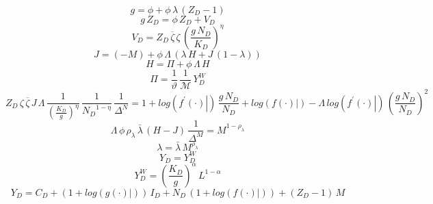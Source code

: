 \documentclass[10pt,a4paper]{article}
\begin{document}
\footnotesize
\begin{dmath}
{g}=\phi+\phi\, {\lambda}\, \left({Z_D}-1\right)
\end{dmath}
\begin{dmath}
{g}\, {Z_D}=\phi\, {Z_D}+{V_D}
\end{dmath}
\begin{dmath}
{V_D}={Z_D}\, {\overline{\zeta}}\, {\zeta}\, \left(\frac{{g}\, {N_D}}{{K_D}}\right)^{\eta}
\end{dmath}
\begin{dmath}
{J}=\left(-{M}\right)+\phi\, {\Lambda}\, \left({\lambda}\, {H}+{J}\, \left(1-{\lambda}\right)\right)
\end{dmath}
\begin{dmath}
{H}={\Pi}+\phi\, {\Lambda}\, {H}
\end{dmath}
\begin{dmath}
{\Pi}=\frac{1}{\vartheta}\, \frac{1}{{\mathcal{M}}}\, {Y^W_D}
\end{dmath}
\begin{dmath}
{Z_D}\, {\zeta}\, {\overline{\zeta}}\, {J}\, {\Lambda}\, \frac{1}{\left(\frac{{K_D}}{{g}}\right)^{\eta}}\, \frac{1}{{N_D}^{1-\eta}}\, \frac{1}{{\Delta^N}}=1+log\left({\left.       f^{\prime}\left( \cdot \right)   \right|}\right)\, \frac{{g}\, {N_D}}{{N_D}}+log\left({\left.       f\left( \cdot \right)            \right|}\right)-{\Lambda}\, log\left({\left.       f^{\prime}\left( \cdot \right)   \right|}\right)\, \left(\frac{{g}\, {N_D}}{{N_D}}\right)^{2}
\end{dmath}
\begin{dmath}
{\Lambda}\, \phi\, {\rho_\lambda}\, {\bar{\lambda}}\, \left({H}-{J}\right)\, \frac{1}{{\Delta^M}}={M}^{1-{\rho_\lambda}}
\end{dmath}
\begin{dmath}
{\lambda}={\bar{\lambda}}\, {M}^{{\rho_\lambda}}
\end{dmath}
\begin{dmath}
{Y_D}={Y^W_D}
\end{dmath}
\begin{dmath}
{Y^W_D}=\left(\frac{{K_D}}{{g}}\right)^{\alpha}\, {L}^{1-\alpha}
\end{dmath}
\begin{dmath}
{Y_D}={C_D}+\left(1+log\left({\left.       g\left( \cdot \right)            \right|}\right)\right)\, {I_D}+{N_D}\, \left(1+log\left({\left.       f\left( \cdot \right)            \right|}\right)\right)+\left({Z_D}-1\right)\, {M}
\end{dmath}
\end{document}
